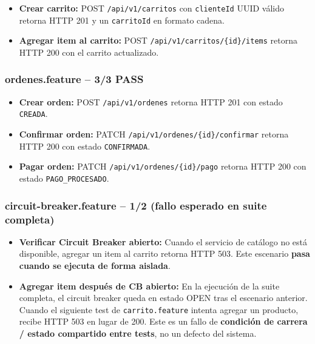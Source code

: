 \documentclass[12pt,a4paper]{article}
\newcommand{\pass}{\textcolor{passgreen}{\bfseries PASS}}
\newcommand{\fail}{\textcolor{failred}{\bfseries FAIL}}
\begin{document}
\begin{itemize}[leftmargin=2cm]
  \item[\pass] \textbf{Crear carrito:} POST \texttt{/api/v1/carritos} con \texttt{clienteId} UUID v\'alido retorna HTTP 201 y un \texttt{carritoId} en formato cadena.
  \item[\pass] \textbf{Agregar item al carrito:} POST \texttt{/api/v1/carritos/\{id\}/items} retorna HTTP 200 con el carrito actualizado.
\end{itemize}

\subsubsection{ordenes.feature -- 3/3 PASS}

\begin{itemize}[leftmargin=2cm]
  \item[\pass] \textbf{Crear orden:} POST \texttt{/api/v1/ordenes} retorna HTTP 201 con estado \texttt{CREADA}.
  \item[\pass] \textbf{Confirmar orden:} PATCH \texttt{/api/v1/ordenes/\{id\}/confirmar} retorna HTTP 200 con estado \texttt{CONFIRMADA}.
  \item[\pass] \textbf{Pagar orden:} PATCH \texttt{/api/v1/ordenes/\{id\}/pago} retorna HTTP 200 con estado \texttt{PAGO\_PROCESADO}.
\end{itemize}

\subsubsection{circuit-breaker.feature -- 1/2 (fallo esperado en suite completa)}

\begin{itemize}[leftmargin=2cm]
  \item[\pass] \textbf{Verificar Circuit Breaker abierto:} Cuando el servicio de cat\'alogo no est\'a disponible, agregar un item al carrito retorna HTTP 503. Este escenario \textbf{pasa cuando se ejecuta de forma aislada}.
  \item[\fail] \textbf{Agregar item despu\'es de CB abierto:} En la ejecuci\'on de la suite completa, el circuit breaker queda en estado OPEN tras el escenario anterior. Cuando el siguiente test de \texttt{carrito.feature} intenta agregar un producto, recibe HTTP 503 en lugar de 200. Este es un fallo de \textbf{condici\'on de carrera / estado compartido entre tests}, no un defecto del sistema.
\end{itemize}
\end{document}
